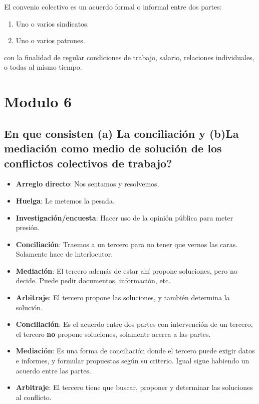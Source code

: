 \documentclass[spanish,12pt,a4paper,titlepage]{report}
\begin{document}
El convenio colectivo es un acuerdo formal o informal entre dos partes:
\begin{enumerate}
\item Uno o varios sindicatos.
\item Uno o varios patrones.
\end{enumerate}
con la finalidad de regular condiciones de trabajo, salario, relaciones individuales, o todas al mismo tiempo.

\section{Modulo 6}

\subsection{En que consisten (a) La conciliación y (b)La mediación como medio de solución de los conflictos colectivos de trabajo?}

\label{sec:sol-conflictos-colectivos}

\begin{itemize}
\item \textbf{Arreglo directo}: Nos sentamos y resolvemos.
\item \textbf{Huelga}: Le metemos la pesada.
\item \textbf{Investigación/encuesta}: Hacer uso de la opinión pública para meter presión.
\item \textbf{Conciliación}: Traemos a un tercero para no tener que vernos las caras. Solamente hace de interlocutor.
\item \textbf{Mediación}: El tercero además de estar ahí propone soluciones, pero no decide. Puede pedir documentos, información, etc.
\item \textbf{Arbitraje}: El tercero propone las soluciones, y también determina la solución.
\end{itemize}

\begin{itemize}
\item \textbf{Conciliación}: Es el acuerdo entre dos partes con intervención de un tercero, el tercero \textbf{no} propone soluciones, solamente acerca a las partes.
\item \textbf{Mediación}: Es una forma de conciliación donde el tercero puede exigir datos e informes, y formular propuestas según su criterio. Igual sigue habiendo un acuerdo entre las partes.
\item \textbf{Arbitraje}: El tercero tiene que buscar, proponer y determinar las soluciones al conflicto.
\end{itemize}
\end{document}
